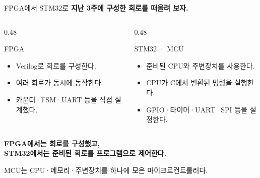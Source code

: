 \documentclass[aspectratio=43,11pt,t]{beamer}
\begin{document}
\begin{frame}{FPGA에서 STM32로}
\fontsize{10}{13}\selectfont
\textbf{지난 3주에 구성한 회로를 떠올려 보자.}
\vspace{0.25cm}
\begin{columns}[T]
\begin{column}{0.48\textwidth}
\begin{block}{FPGA}
\fontsize{9}{12}\selectfont
\begin{itemize}\setlength{\itemsep}{0.18cm}
\item Verilog로 회로를 구성한다.
\item 여러 회로가 동시에 동작한다.
\item 카운터·FSM·UART 등을 직접 설계했다.
\end{itemize}
\end{block}
\end{column}
\begin{column}{0.48\textwidth}
\begin{block}{STM32 · MCU}
\fontsize{9}{12}\selectfont
\begin{itemize}\setlength{\itemsep}{0.18cm}
\item 준비된 CPU와 주변장치를 사용한다.
\item CPU가 C에서 변환된 명령을 실행한다.
\item GPIO·타이머·UART·SPI 등을 설정한다.
\end{itemize}
\end{block}
\end{column}
\end{columns}
\vspace{0.30cm}
\textbf{FPGA에서는 회로를 구성했고,\\STM32에서는 준비된 회로를 프로그램으로 제어한다.}
\vspace{0.18cm}
\par\fontsize{8}{11}\selectfont
MCU는 CPU·메모리·주변장치를 하나에 모은 마이크로컨트롤러다.

\end{frame}
\end{document}
